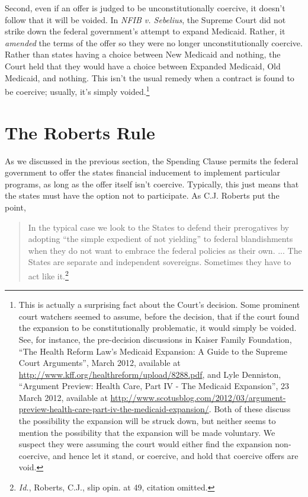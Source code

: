 \documentclass[
  10pt,
  letterpaper,
  DIV=11,
  numbers=noendperiod,
  twoside]{scrartcl}
\begin{document}
Second, even if an offer is judged to be unconstitutionally coercive, it
doesn't follow that it will be voided. In \emph{NFIB v. Sebelius}, the
Supreme Court did not strike down the federal government's attempt to
expand Medicaid. Rather, it \emph{amended} the terms of the offer so
they were no longer unconstitutionally coercive. Rather than states
having a choice between New Medicaid and nothing, the Court held that
they would have a choice between Expanded Medicaid, Old Medicaid, and
nothing. This isn't the usual remedy when a contract is found to be
coercive; usually, it's simply voided.\footnote{This is actually a
  surprising fact about the Court's decision. Some prominent court
  watchers seemed to assume, before the decision, that if the court
  found the expansion to be constitutionally problematic, it would
  simply be voided. See, for instance, the pre-decision discussions in
  Kaiser Family Foundation, ``The Health Reform Law's Medicaid
  Expansion: A Guide to the Supreme Court Arguments'', March 2012,
  available at \url{http://www.kff.org/healthreform/upload/8288.pdf},
  and Lyle Denniston, ``Argument Preview: Health Care, Part IV - The
  Medicaid Expansion'', 23 March 2012, available at
  \url{http://www.scotusblog.com/2012/03/argument-preview-health-care-part-iv-the-medicaid-expansion/}.
  Both of these discuss the possibility the expansion will be struck
  down, but neither seems to mention the possibility that the expansion
  will be made voluntary. We suspect they were assuming the court would
  either find the expansion non-coercive, and hence let it stand, or
  coercive, and hold that coercive offers are void.}

\section{The Roberts Rule}\label{the-roberts-rule}

As we discussed in the previous section, the Spending Clause permits the
federal government to offer the states financial inducement to implement
particular programs, as long as the offer itself isn't coercive.
Typically, this just means that the states must have the option not to
participate. As C.J. Roberts put the point,

\begin{quote}
In the typical case we look to the States to defend their prerogatives
by adopting ``the simple expedient of not yielding'' to federal
blandishments when they do not want to embrace the federal policies as
their own. ... The States are separate and independent sovereigns.
Sometimes they have to act like it.\footnote{\emph{Id.}, Roberts, C.J.,
  slip opin. at 49, citation omitted.}
\end{quote}
\end{document}
